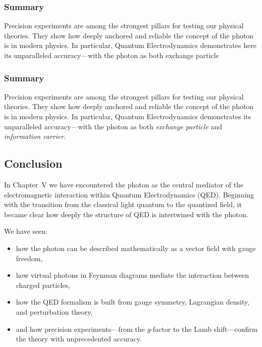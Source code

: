\subsubsection{Summary}

Precision experiments are among the strongest pillars for testing our physical theories. They show how deeply anchored and reliable the concept of the photon is in modern physics. In particular, Quantum Electrodynamics demonstrates here its unparalleled accuracy—with the photon as both exchange particle
\subsubsection{Summary}

Precision experiments are among the strongest pillars for testing our physical theories. They show how deeply anchored and reliable the concept of the photon is in modern physics. In particular, Quantum Electrodynamics demonstrates its unparalleled accuracy—with the photon as both \emph{exchange particle} and \emph{information carrier}.

\subsection{Conclusion}

In Chapter~V we have encountered the photon as the central mediator of the electromagnetic interaction within Quantum Electrodynamics (QED). Beginning with the transition from the classical light quantum to the quantized field, it became clear how deeply the structure of QED is intertwined with the photon.

We have seen:
\begin{itemize}
	\item how the photon can be described mathematically as a vector field with gauge freedom,
	\item how virtual photons in Feynman diagrams mediate the interaction between charged particles,
	\item how the QED formalism is built from gauge symmetry, Lagrangian density, and perturbation theory,
	\item and how precision experiments—from the $g$-factor to the Lamb shift—confirm the theory with unprecedented accuracy.
\end{itemize}

